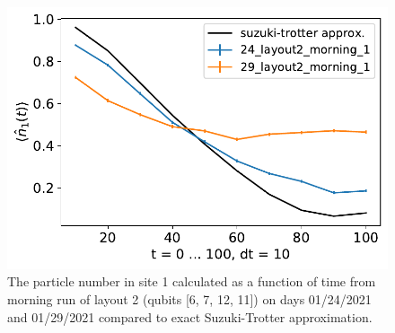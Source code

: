 \begin{figure}[htpb]
    \includegraphics[scale=0.5]{TIM_[24, 29]_[layout2]_[morning]_n1.pdf}
    \caption{The particle number in site 1 calculated as a function of time from morning run of layout 2 (qubits [6, 7, 12, 11]) on days 01/24/2021 and 01/29/2021 compared to exact Suzuki-Trotter approximation.}
    \label{fig:n1_Story4}
\end{figure}



